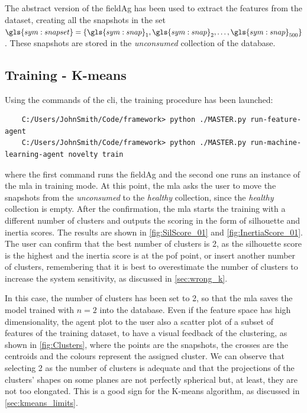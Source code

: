 The abstract version of the \gls{fieldAg} has been used to extract the features from the dataset, creating all the snapshots in the set $\gls{sym:snapset}=\{\gls{sym:snap}_1,\gls{sym:snap}_2,\dots,\gls{sym:snap}_{500}\}$. These snapshots are stored in the \emph{unconsumed} collection of the database.

\subsection{Training - K-means}

Using the commands of the \gls{cli}, the training procedure has been launched:
\begin{verbatim}
    C:/Users/JohnSmith/Code/framework> python ./MASTER.py run-feature-agent
    C:/Users/JohnSmith/Code/framework> python ./MASTER.py run-machine-learning-agent novelty train
\end{verbatim}

where the first command runs the \gls{fieldAg} and the second one runs an  instance of the \gls{mla} in training mode.
At this point, the \gls{mla} asks the user to move the snapshots from the \emph{unconsumed} to the \emph{healthy} collection, since the \emph{healthy} collection is empty. After the confirmation, the \gls{mla} starts the training with a different number of clusters and outputs the scoring in the form of silhouette and inertia scores. The results are shown in \autoref{fig:SilScore_01} and \autoref{fig:InertiaScore_01}. The user can confirm that the best number of clusters is 2, as the silhouette score is the highest and the inertia score is at the \gls{pof} point, or insert another number of clusters, remembering that it is best to overestimate the number of clusters to increase the system sensitivity, as discussed in \autoref{sec:wrong_k}. 

In this case, the number of clusters has been set to 2, so that the \gls{mla} saves the model trained with $n=2$ into the database. Even if the feature space has high dimensionality, the agent plot to the user also a scatter plot of a subset of features of the training dataset, to have a visual feedback of the clustering, as shown in \autoref{fig:Clusters}, where the points are the snapshots, the crosses are the centroids and the colours represent the assigned cluster. We can observe that selecting 2 as the number of clusters is adequate and that the projections of the clusters' shapes on some planes are not perfectly spherical but, at least, they are not too elongated. This is a good sign for the K-means algorithm, as discussed in \autoref{sec:kmeans_limits}.

